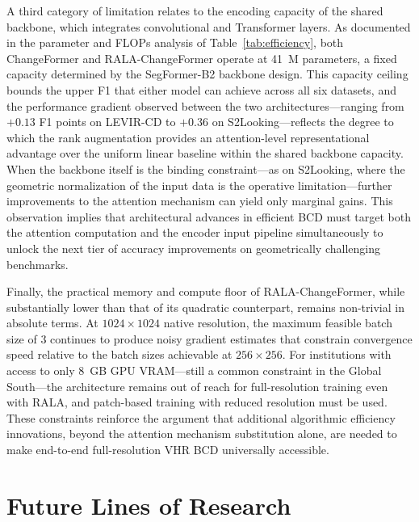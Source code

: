 A third category of limitation relates to the encoding capacity of the shared backbone, which integrates convolutional and Transformer layers. As documented in the parameter and FLOPs analysis of Table~\ref{tab:efficiency}, both ChangeFormer and RALA-ChangeFormer operate at 41~M parameters, a fixed capacity determined by the SegFormer-B2 backbone design. This capacity ceiling bounds the upper F1 that either model can achieve across all six datasets, and the performance gradient observed between the two architectures---ranging from $+0.13$ F1 points on LEVIR-CD to $+0.36$ on S2Looking---reflects the degree to which the rank augmentation provides an attention-level representational advantage over the uniform linear baseline within the shared backbone capacity. When the backbone itself is the
binding constraint---as on S2Looking, where the geometric normalization of the
input data is the operative limitation---further improvements to the attention
mechanism can yield only marginal gains. This observation implies that
architectural advances in efficient BCD must target both the attention
computation and the encoder input pipeline simultaneously to unlock the next
tier of accuracy improvements on geometrically challenging benchmarks.

Finally, the practical memory and compute floor of RALA-ChangeFormer, while
substantially lower than that of its quadratic counterpart, remains non-trivial
in absolute terms. At $1024 \times 1024$ native resolution, the maximum feasible
batch size of 3 continues to produce noisy gradient estimates that constrain
convergence speed relative to the batch sizes achievable at $256 \times 256$.
For institutions with access to only 8~GB GPU VRAM---still a common constraint
in the Global South---the architecture remains out of reach for full-resolution
training even with RALA, and patch-based training with reduced resolution must
be used. These constraints reinforce the argument that additional algorithmic
efficiency innovations, beyond the attention mechanism substitution alone, are
needed to make end-to-end full-resolution VHR BCD universally accessible.


\section{Future Lines of Research}
\label{sec:conclusions-future}

